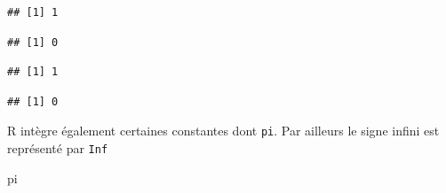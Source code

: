 \documentclass[]{book}
\newenvironment{Shaded}{\begin{snugshade}}{\end{snugshade}}
\newcommand{\DecValTok}[1]{\textcolor[rgb]{0.00,0.00,0.81}{#1}}
\newcommand{\NormalTok}[1]{#1}
\newcommand{\OperatorTok}[1]{\textcolor[rgb]{0.81,0.36,0.00}{\textbf{#1}}}
\newcommand{\StringTok}[1]{\textcolor[rgb]{0.31,0.60,0.02}{#1}}
\begin{document}
\begin{Shaded}
\end{Shaded}

\begin{verbatim}
## [1] 1
\end{verbatim}

\begin{Shaded}
\end{Shaded}

\begin{verbatim}
## [1] 0
\end{verbatim}

\begin{Shaded}
\end{Shaded}

\begin{verbatim}
## [1] 1
\end{verbatim}

\begin{Shaded}
\end{Shaded}

\begin{verbatim}
## [1] 0
\end{verbatim}

R intègre également certaines constantes dont \texttt{pi}. Par ailleurs le signe infini est représenté par \texttt{Inf}

\begin{Shaded}
\begin{Highlighting}[]
\NormalTok{pi}
\end{Highlighting}
\end{Shaded}
\end{document}
